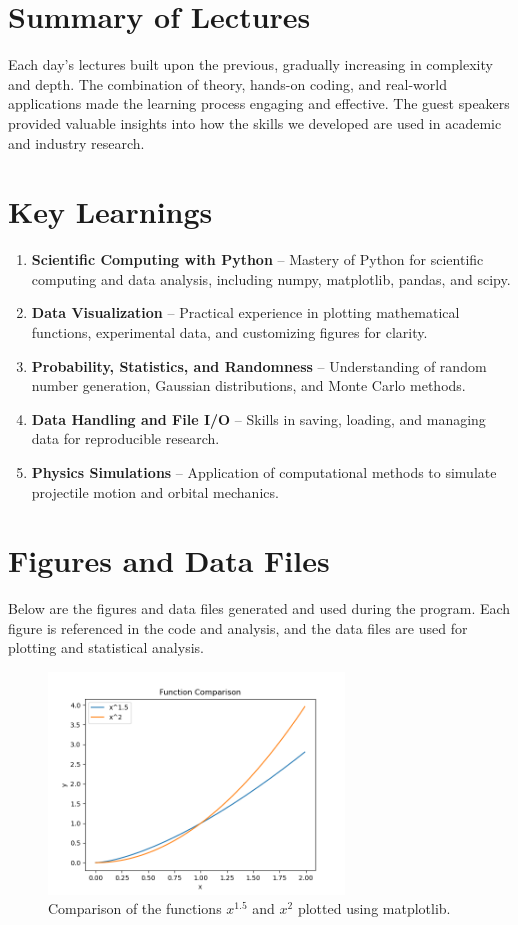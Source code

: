 \documentclass[12pt]{article}
\begin{document}
\section*{Summary of Lectures}
Each day's lectures built upon the previous, gradually increasing in complexity and depth. The combination of theory, hands-on coding, and real-world applications made the learning process engaging and effective. The guest speakers provided valuable insights into how the skills we developed are used in academic and industry research.

\section*{Key Learnings}
\begin{enumerate}
  \item \textbf{Scientific Computing with Python} -- Mastery of Python for scientific computing and data analysis, including numpy, matplotlib, pandas, and scipy.
  \item \textbf{Data Visualization} -- Practical experience in plotting mathematical functions, experimental data, and customizing figures for clarity.
  \item \textbf{Probability, Statistics, and Randomness} -- Understanding of random number generation, Gaussian distributions, and Monte Carlo methods.
  \item \textbf{Data Handling and File I/O} -- Skills in saving, loading, and managing data for reproducible research.
  \item \textbf{Physics Simulations} -- Application of computational methods to simulate projectile motion and orbital mechanics.
\end{enumerate}

\section*{Figures and Data Files}
Below are the figures and data files generated and used during the program. Each figure is referenced in the code and analysis, and the data files are used for plotting and statistical analysis.


\begin{figure}[h!]
  \centering
  \includegraphics[width=0.7\textwidth]{../figures/Figure_1.png}
  \caption{Comparison of the functions $x^{1.5}$ and $x^2$ plotted using matplotlib.}
\end{figure}
\end{document}
